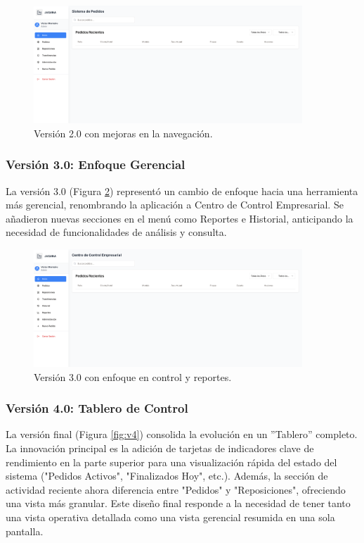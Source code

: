 \documentclass[12pt,letterpaper,spanish]{report}
\begin{document}
\begin{figure}[H]
    \centering
    \includegraphics[width=0.9\textwidth]{V2.0.png}
    \caption{Versión 2.0 con mejoras en la navegación.}
    \label{fig:v2}
\end{figure}

\subsubsection{Versión 3.0: Enfoque Gerencial}
La versión 3.0 (Figura \ref{fig:v3}) representó un cambio de enfoque hacia una herramienta más gerencial, renombrando la aplicación a Centro de Control Empresarial. Se añadieron nuevas secciones en el menú como Reportes e Historial, anticipando la necesidad de funcionalidades de análisis y consulta.

\begin{figure}[H]
    \centering
    \includegraphics[width=0.9\textwidth]{V3.0.png}
    \caption{Versión 3.0 con enfoque en control y reportes.}
    \label{fig:v3}
\end{figure}

\subsubsection{Versión 4.0: Tablero de Control}
La versión final (Figura \ref{fig:v4}) consolida la evolución en un ''Tablero'' completo. La innovación principal es la adición de tarjetas de indicadores clave de rendimiento en la parte superior para una visualización rápida del estado del sistema ("Pedidos Activos", "Finalizados Hoy", etc.). Además, la sección de actividad reciente ahora diferencia entre "Pedidos" y "Reposiciones", ofreciendo una vista más granular. Este diseño final responde a la necesidad de tener tanto una vista operativa detallada como una vista gerencial resumida en una sola pantalla.
\end{document}
